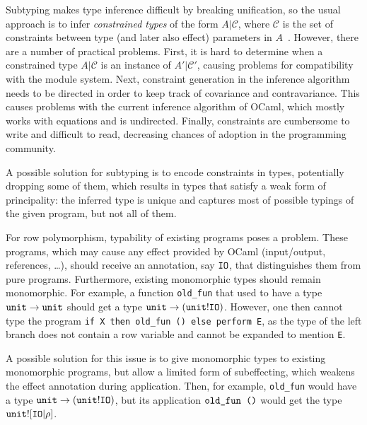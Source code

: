\documentclass[a4paper,UKenglish]{dagrep}
\begin{document}
Subtyping makes type inference difficult by breaking unification, so the usual approach is to infer \emph{constrained types} of the form $A | \mathcal{C}$, where $\mathcal{C}$ is the set of constraints between type (and later also effect) parameters in $A$~\cite{pottier-thesis}. However, there are a number of practical problems. First, it is hard to determine when a constrained type $A | \mathcal{C}$ is an instance of $A' | \mathcal{C}'$, causing problems for compatibility with the module system. Next, constraint generation in the inference algorithm needs to be directed in order to keep track of covariance and contravariance. This causes problems with the current inference algorithm of OCaml, which mostly works with equations and is undirected. Finally, constraints are cumbersome to write and difficult to read, decreasing chances of adoption in the programming community.

A possible solution for subtyping is to encode constraints in types, potentially dropping some of them, which results in types that satisfy a weak form of principality: the inferred type is unique and captures most of possible typings of the given program, but not all of them.

For row polymorphism, typability of existing programs poses a problem. These programs, which may cause any effect provided by OCaml (input/output, references, \ldots), should receive an annotation, say $\mathtt{IO}$, that distinguishes them from pure programs. Furthermore, existing monomorphic types should remain monomorphic. For example, a function \verb|old_fun| that used to have a type $\mathtt{unit} \to \mathtt{unit}$ should get a type $\mathtt{unit} \to (\mathtt{unit} ! \mathtt{IO})$. However, one then cannot type the program \verb|if X then old_fun () else perform E|, as the type of the left branch does not contain a row variable and cannot be expanded to mention \verb|E|.

A possible solution for this issue is to give monomorphic types to existing monomorphic programs, but allow a limited form of subeffecting, which weakens the effect annotation during application. Then, for example, \verb|old_fun| would have a type $\mathtt{unit} \to (\mathtt{unit} ! \mathtt{IO})$, but its application $\verb|old_fun ()|$ would get the type $\mathtt{unit} ! [\mathtt{IO} | \rho]$.

% 
% 
\end{document}
